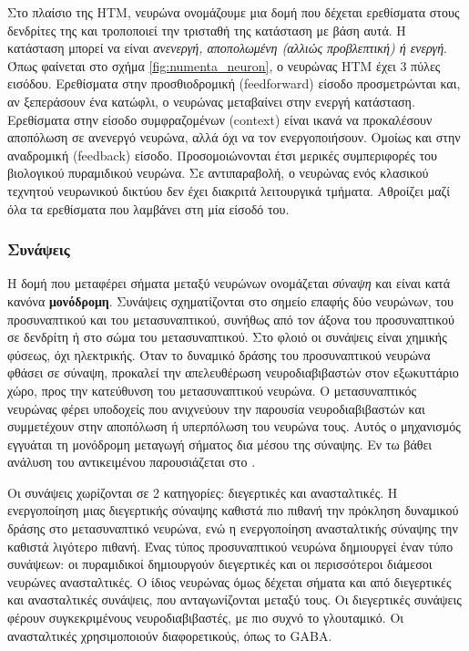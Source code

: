 	Στο πλαίσιο της HTM, νευρώνα ονομάζουμε μια δομή που δέχεται ερεθίσματα στους δενδρίτες της και τροποποιεί την τρισταθή της κατάσταση με βάση αυτά.
	Η κατάσταση μπορεί να είναι \textit{ανενεργή, αποπολωμένη (αλλιώς προβλεπτική) ή ενεργή}.
	Όπως φαίνεται στο σχήμα \ref{fig:numenta_neuron}, ο νευρώνας HTM έχει 3 πύλες εισόδου.
	Ερεθίσματα στην προσθιοδρομική (feedforward) είσοδο προσμετρώνται και, αν ξεπεράσουν ένα κατώφλι, ο νευρώνας μεταβαίνει στην ενεργή κατάσταση.
	Ερεθίσματα στην είσοδο συμφραζομένων (context) είναι ικανά να προκαλέσουν αποπόλωση σε ανενεργό νευρώνα, αλλά όχι να τον ενεργοποιήσουν.
	Ομοίως και στην αναδρομική (feedback) είσοδο.
	Προσομοιώνονται έτσι μερικές συμπεριφορές του βιολογικού πυραμιδικού νευρώνα.
	Σε αντιπαραβολή, ο νευρώνας ενός κλασικού τεχνητού νευρωνικού δικτύου δεν έχει διακριτά λειτουργικά τμήματα.
  Αθροίζει μαζί όλα τα ερεθίσματα που λαμβάνει στη μία είσοδό του.

	\subsubsection{Συνάψεις}

	Η δομή που μεταφέρει σήματα μεταξύ νευρώνων ονομάζεται \textit{σύναψη} και είναι κατά κανόνα \textbf{μονόδρομη}.
	Συνάψεις σχηματίζονται στο σημείο επαφής δύο νευρώνων, του προσυναπτικού και του μετασυναπτικού, συνήθως από τον άξονα του προσυναπτικού σε δενδρίτη ή στο σώμα του μετασυναπτικού.
	Στο φλοιό οι συνάψεις είναι χημικής φύσεως, όχι ηλεκτρικής.
	Όταν το δυναμικό δράσης του προσυναπτικού νευρώνα φθάσει σε σύναψη, προκαλεί την απελευθέρωση νευροδιαβιβαστών στον εξωκυττάριο χώρο,
	προς την κατεύθυνση του μετασυναπτικού νευρώνα.
	Ο μετασυναπτικός νευρώνας φέρει υποδοχείς που ανιχνεύουν την παρουσία νευροδιαβιβαστών και συμμετέχουν στην αποπόλωση ή υπερπόλωση του νευρώνα τους.
	Αυτός ο μηχανισμός εγγυάται τη μονόδρομη μεταγωγή σήματος δια μέσου της σύναψης.
	Εν τω βάθει ανάλυση του αντικειμένου παρουσιάζεται στο \cite{kandelPrinciplesNeuralScience2013}.

	Οι συνάψεις χωρίζονται σε 2 κατηγορίες: διεγερτικές και ανασταλτικές.
	Η ενεργοποίηση μιας διεγερτικής σύναψης καθιστά πιο πιθανή την πρόκληση δυναμικού δράσης στο μετασυναπτικό νευρώνα,
	ενώ η ενεργοποίηση ανασταλτικής σύναψης την καθιστά λιγότερο πιθανή.
	Ένας τύπος προσυναπτικού νευρώνα δημιουργεί έναν τύπο συνάψεων: οι πυραμιδικοί δημιουργούν διεγερτικές και οι περισσότεροι διάμεσοι νευρώνες ανασταλτικές.
	Ο ίδιος νευρώνας όμως δέχεται σήματα και από διεγερτικές και ανασταλτικές συνάψεις, που ανταγωνίζονται μεταξύ τους.
	Οι διεγερτικές συνάψεις φέρουν συγκεκριμένους νευροδιαβιβαστές, με πιο συχνό το γλουταμικό.
	Οι ανασταλτικές χρησιμοποιούν διαφορετικούς, όπως το GABA.

